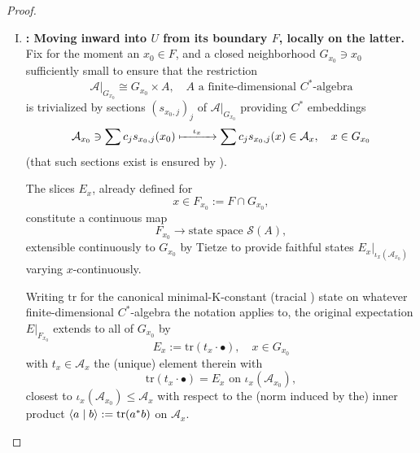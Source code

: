 \documentclass[11pt,leqno]{article}
\theoremstyle{plain}
\theoremstyle{plain}
\theoremstyle{plain}
\numberwithin{equation}{section}
\theoremstyle{nonumberplain}
\newtheorem{proof}{Proof}
\newcommand\cA{{\mathcal A}}
\newcommand\cS{{\mathcal S}}
\newcommand\1{{\bf 1}}
\begin{document}
\begin{proof}
  \begin{enumerate}[(I),wide]
  \item\label{item:frwrd.loc} {\bf : Moving inward into $U$ from its boundary $F$, locally on the latter.} Fix for the moment an $x_0\in F$, and a closed neighborhood $G_{x_0}\ni x_0$ sufficiently small to ensure that the restriction
    \begin{equation*}
      \cA|_{G_{x_0}}
      \cong G_{x_0}\times A
      ,\quad\text{$A$ a finite-dimensional $C^*$-algebra}
    \end{equation*}
    is trivialized by sections $(s_{x_0,j})_j$ of $\cA|_{G_{x_0}}$ providing $C^*$ embeddings
    \begin{equation}\label{eq:nearby.emb}
      \cA_{x_0}
      \ni
      \sum c_j s_{x_0,j}(x_0)
      \xmapsto{\quad\iota_x\quad}
      \sum c_j s_{x_0,j}(x)
      \in
      \cA_x
      ,\quad x\in G_{x_0}
    \end{equation}
    (that such sections exist is ensured by \cite[Theorem 3.1]{fell_struct}).
    
    The slices $E_x$, already defined for 
    \begin{equation*}
      x\in F_{x_0}:=F\cap G_{x_0},
    \end{equation*}
    constitute a continuous map
    \begin{equation*}
      F_{x_0}
      \xrightarrow{\quad}
      \text{state space }\cS(A),
    \end{equation*}
    extensible continuously to $G_{x_0}$ by Tietze \cite[Theorem 15.8]{wil_top} to provide faithful states $E_x|_{\iota_x(\cA_{x_0})}$ varying $x$-continuously. 
    
    Writing $\mathrm{tr}$ for the canonical minimal-K-constant (tracial \cite[Lemma 3.2]{bg_cx-exp}) state on whatever finite-dimensional $C^*$-algebra the notation applies to, the original expectation $E|_{F_{x_0}}$ extends to all of $G_{x_0}$ by 
    \begin{equation*}
      E_x := \mathrm{tr}(t_x\cdot \bullet)
      ,\quad
      x\in G_{x_0}
    \end{equation*}    
    with $t_x\in \cA_x$ the (unique) element therein with
    \begin{equation*}
      \mathrm{tr}(t_x\cdot\bullet) = E_x\text{ on }\iota_x(\cA_{x_0}),
    \end{equation*}
    closest to $\iota_x(\cA_{x_0})\le \cA_x$ with respect to the (norm induced by the) inner product $\braket{a\mid b}:=\mathrm{tr}(a^*b)$ on $\cA_x$.


\end{enumerate}
\end{proof}
\end{document}
